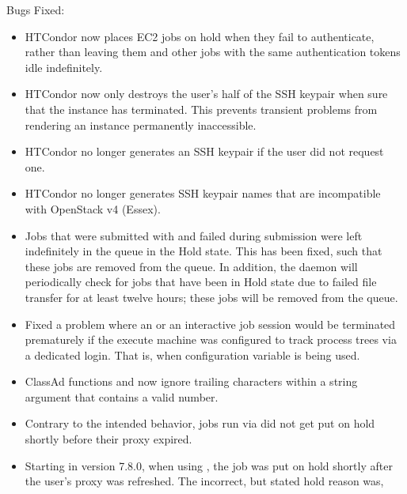 \noindent Bugs Fixed:

\begin{itemize}

\item HTCondor now places EC2 jobs on hold when they fail to authenticate,
rather than leaving them and other jobs with the same authentication tokens
idle indefinitely.

\item HTCondor now only destroys the user's half of the SSH keypair
when sure that the instance has terminated.  This prevents transient
problems from rendering an instance permanently inaccessible.

\item HTCondor no longer generates an SSH keypair if the user did not
request one.

\item HTCondor no longer generates SSH keypair names that are incompatible
with OpenStack v4 (Essex).

\item Jobs that were submitted with  
and failed during submission were 
left indefinitely in the queue in the Hold state.  
This has been fixed, such that these jobs are removed from the queue.
In addition, the  daemon will periodically 
check for jobs that have
been in Hold state due to failed file transfer for at least twelve hours;
these jobs will be removed from the queue.

\item Fixed a problem where an  or an interactive job 
session would be terminated prematurely if the execute machine 
was configured to track process trees via a dedicated login.
That is, when configuration variable 
 is being used.  

\item ClassAd functions  and  now ignore 
trailing characters within
a string argument that contains a valid number.

\item Contrary to the intended behavior, jobs run via  did not
get put on hold shortly before their proxy expired.

\item Starting in version 7.8.0, when using , 
the job was put on hold shortly after the user's proxy was refreshed.
The incorrect, but stated hold reason was, 


\end{itemize}
